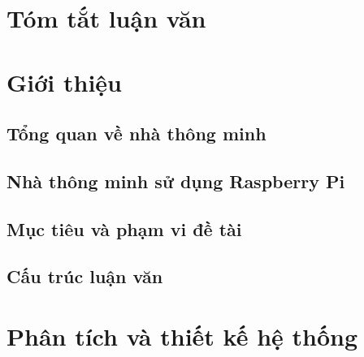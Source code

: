 \documentclass[11pt,a4paper,oneside]{book}
\begin{document}
\chapter*{Tóm tắt luận văn}

\begingroup
\let\cleardoublepage\clearpage
\tableofcontents 
% 
\endgroup

\renewcommand{\listtablename}{Danh mục bảng}
\listoftables
{}

\renewcommand{\listfigurename}{Danh mục hình ảnh}
\listoffigures
{}

\mainmatter

\chapter{Giới thiệu}
\newpage
\section{Tổng quan về nhà thông minh}
\newpage
\section{Nhà thông minh sử dụng Raspberry Pi}
\newpage
\section{Mục tiêu và phạm vi đề tài}
\newpage
\section{Cấu trúc luận văn}

\chapter{Phân tích và thiết kế hệ thống}
\newpage
\end{document}
